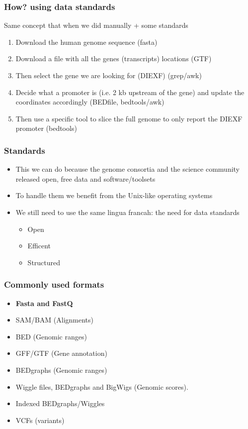 \documentclass{beamer}
\begin{document}
\begin{frame}
  \frametitle{How? using data standards}
  Same concept that when we did manually + some standards
  \begin{enumerate}
  \item Download the human genome sequence (fasta)
  \item Download a file with all the genes (transcripts) locations (GTF)
  \item Then select the gene we are looking for (DIEXF) (grep/awk)
  \item Decide what a promoter is (i.e. 2 kb upstream of the gene) and update the coordinates accordingly (BEDfile, bedtools/awk)
  \item Then use a specific tool to slice the full genome to only report the DIEXF promoter (bedtools)
  \end{enumerate}
\end{frame}

\begin{frame}
  \frametitle{Standards}
  \begin{itemize}
  \item This we can do because the genome consortia and the science community released open, free data and software/toolsets
  \item To handle them we benefit from the Unix-like operating systems
  \item We still need to use the same lingua francah: the need for data standards 
    \begin{itemize}
    \item Open
    \item Efficent
    \item Structured
    \end{itemize}
  \end{itemize}
\end{frame}

\begin{frame}
  \frametitle{Commonly used formats}
  \begin{itemize}

  \item \textbf{Fasta and FastQ}
 
  \item SAM/BAM (Alignments)
 
  \item BED (Genomic ranges)
 
  \item GFF/GTF (Gene annotation)
 
  \item BEDgraphs (Genomic ranges)
 
  \item Wiggle files, BEDgraphs and BigWigs (Genomic scores).
 
  \item Indexed BEDgraphs/Wiggles

  \item VCFs (variants)

  \end{itemize}
\end{frame}
\end{document}

